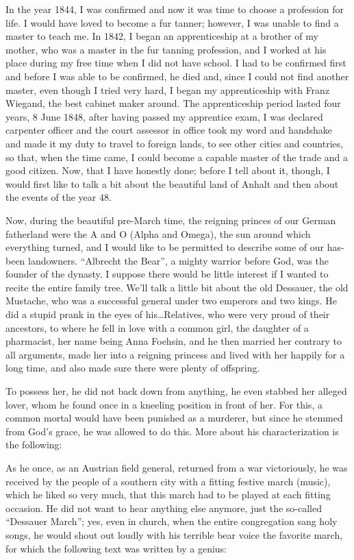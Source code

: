 \documentclass{article}
\begin{document}
In the year 1844, I was confirmed and now it was time to choose a profession for life. I would have loved to become a fur tanner; however, I was unable to find a master to teach me. In 1842, I began an apprenticeship at a brother of my mother, who was a master in the fur tanning profession, and I worked at his place during my free time when I did not have school. I had to be confirmed first and before I was able to be confirmed, he died and, since I could not find another master, even though I tried very hard, I began my apprenticeship with Franz Wiegand, the best cabinet maker around. The apprenticeship period lasted four years, 8 June 1848, after having passed my apprentice exam, I was declared carpenter officer and the court assessor in office took my word and handshake and made it my duty to travel to foreign lands, to see other cities and countries, so that, when the time came, I could become a capable master of the trade and a good citizen. Now, that I have honestly done; before I tell about it, though, I would first like to talk a bit about the beautiful land of Anhalt and then about the events of the year 48.

Now, during the beautiful pre-March time, the reigning princes of our German fatherland were the A and O (Alpha and Omega), the sun around which everything turned, and I would like to be permitted to describe some of our has-been landowners. ``Albrecht the Bear'', a mighty warrior before God, was the founder of the dynasty. I suppose there would be little interest if I wanted to recite the entire family tree. We'll talk a little bit about the old Dessauer, the old Mustache, who was a successful general under two emperors and two kings. He did a stupid prank in the eyes of his\ldots Relatives, who were very proud of their ancestors, to where he fell in love with a common girl, the daughter of a pharmacist, her name being Anna Foehsin, and he then married her contrary to all arguments, made her into a reigning princess and lived with her happily for a long time, and also made sure there were plenty of offspring.

To possess her, he did not back down from anything, he even stabbed her alleged lover, whom he found once in a kneeling position in front of her. For this, a common mortal would have been punished as a murderer, but since he stemmed from God's grace, he was allowed to do this. More about his characterization is the following:

As he once, as an Austrian field general, returned from a war victoriously, he was received by the people of a southern city with a fitting festive march (music), which he liked so very much, that this march had to be played at each fitting occasion. He did not want to hear anything else anymore, just the so-called ``Dessauer March''; yes, even in church, when the entire congregation sang holy songs, he would shout out loudly with his terrible bear voice the favorite march, for which the following text was written by a genius:
\end{document}

